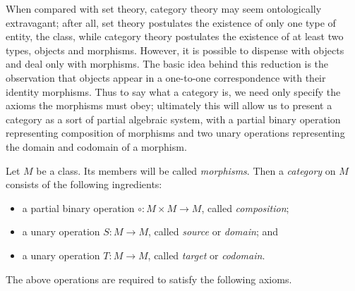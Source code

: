 \documentclass[12pt]{article}
\newcommand{\comp}{\circ}
\newcommand{\src}{S}
\newcommand{\tgt}{T}
\begin{document}
When compared with set theory, category theory may seem ontologically
extravagant; after all, set theory postulates the existence of only
one type of entity, the class, while category theory postulates the
existence of at least two types, objects and morphisms.  However, it
is possible to dispense with objects and deal only with morphisms.
The basic idea behind this reduction is the observation that objects
appear in a one-to-one correspondence with their identity morphisms.
Thus to say what a category is, we need only specify the axioms the
morphisms must obey; ultimately this will allow us to present a
category as a sort of partial algebraic system, with a partial 
binary operation representing composition of morphisms and two 
unary operations representing the domain and codomain of a morphism.

Let $M$ be a class.  Its members will be called \emph{morphisms}.
Then a \emph{category} on $M$ consists of the following ingredients:

\begin{itemize}
\item
a partial binary operation $\comp\colon M\times M\to M$, called
\emph{composition};

\item
a unary operation $\src\colon M\to M$, called \emph{source} or \emph{domain}; and

\item
a unary operation $\tgt\colon M\to M$, called \emph{target} or \emph{codomain}.
\end{itemize}

The above operations are required to satisfy the following axioms.
\end{document}
